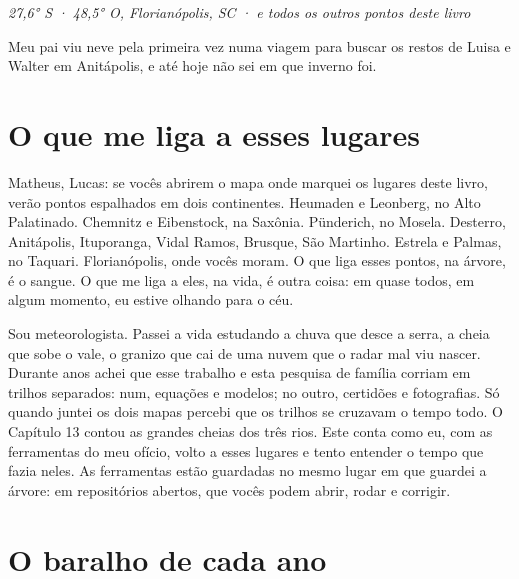 \documentclass[
  brazilian,
  11pt,
  openany]{book}
\begin{document}
\emph{27,6° S · 48,5° O, Florianópolis, SC · e todos os outros pontos
deste livro}

Meu pai viu neve pela primeira vez numa viagem para buscar os restos de
Luisa e Walter em Anitápolis, e até hoje não sei em que inverno foi.

\section{O que me liga a esses
lugares}\label{o-que-me-liga-a-esses-lugares}

Matheus, Lucas: se vocês abrirem o mapa onde marquei os lugares deste
livro, verão pontos espalhados em dois continentes. Heumaden e Leonberg,
no Alto Palatinado. Chemnitz e Eibenstock, na Saxônia. Pünderich, no
Mosela. Desterro, Anitápolis, Ituporanga, Vidal Ramos, Brusque, São
Martinho. Estrela e Palmas, no Taquari. Florianópolis, onde vocês moram.
O que liga esses pontos, na árvore, é o sangue. O que me liga a eles, na
vida, é outra coisa: em quase todos, em algum momento, eu estive olhando
para o céu.

Sou meteorologista. Passei a vida estudando a chuva que desce a serra, a
cheia que sobe o vale, o granizo que cai de uma nuvem que o radar mal
viu nascer. Durante anos achei que esse trabalho e esta pesquisa de
família corriam em trilhos separados: num, equações e modelos; no outro,
certidões e fotografias. Só quando juntei os dois mapas percebi que os
trilhos se cruzavam o tempo todo. O Capítulo 13 contou as grandes cheias
dos três rios. Este conta como eu, com as ferramentas do meu ofício,
volto a esses lugares e tento entender o tempo que fazia neles. As
ferramentas estão guardadas no mesmo lugar em que guardei a árvore: em
repositórios abertos, que vocês podem abrir, rodar e corrigir.

\section{O baralho de cada ano}\label{o-baralho-de-cada-ano}
\end{document}
